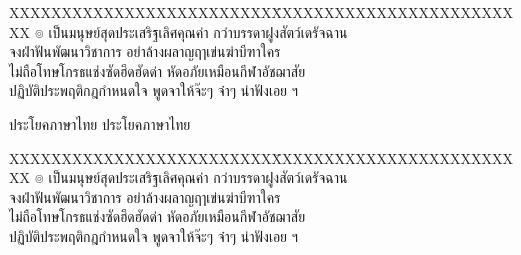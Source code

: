 \documentclass[a4paper]{article}
\begin{document}
    \begin{tabbing}
        {XXXXXXXXXXXXXXXXXXXXXXXXX}\=
        {XXXXXXXXXXXXXXXXXXXXXXXXX}\kill
        \hspace{1em}
        ๏ เป็นมนุษย์สุดประเสริฐเลิศคุณค่า \> กว่าบรรดาฝูงสัตว์เดรัจฉาน \\
        จงฝ่าฟันพัฒนาวิชาการ          \> อย่าล้างผลาญฤๅเข่นฆ่าบีฑาใคร\\
        ไม่ถือโทษโกรธแช่งซัดฮึดฮัดด่า    \> หัดอภัยเหมือนกีฬาอัชฌาสัย \\
        ปฏิบัติประพฤติกฎกำหนดใจ       \> พูดจาให้จ๊ะๆ จ๋าๆ น่าฟังเอย ฯ\\
    \end{tabbing}

    ประโยคภาษาไทย \normalfont ประโยคภาษาไทย

    \bigskip
    \begin{tabbing}
        {XXXXXXXXXXXXXXXXXXXXXXXXX}\=
        {XXXXXXXXXXXXXXXXXXXXXXXXX}\kill
        \hspace{1em}
        ๏ เป็นมนุษย์สุดประเสริฐเลิศคุณค่า \> กว่าบรรดาฝูงสัตว์เดรัจฉาน \\
        จงฝ่าฟันพัฒนาวิชาการ          \> อย่าล้างผลาญฤๅเข่นฆ่าบีฑาใคร\\
        ไม่ถือโทษโกรธแช่งซัดฮึดฮัดด่า    \> หัดอภัยเหมือนกีฬาอัชฌาสัย \\
        ปฏิบัติประพฤติกฎกำหนดใจ       \> พูดจาให้จ๊ะๆ จ๋าๆ น่าฟังเอย ฯ\\
    \end{tabbing}
\end{document}
